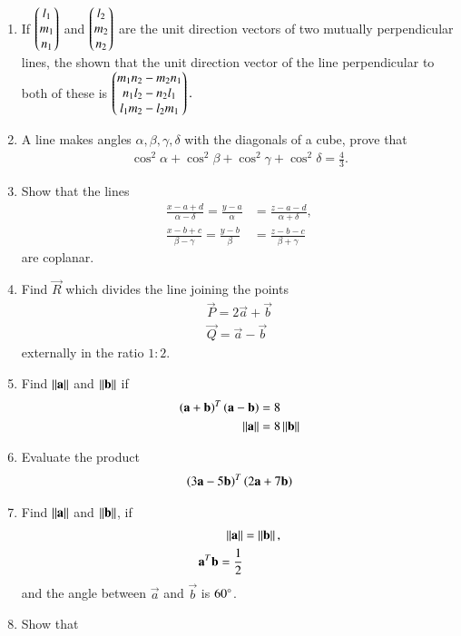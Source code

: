 \begin{enumerate}[label=\arabic*.,ref=\thesubsection.\theenumi]
\item If 
$
\begin{pmatrix}l_1\\m_1\\n_1\end{pmatrix}
$
and
$
\begin{pmatrix}l_2\\m_2\\n_2\end{pmatrix}
$
are the unit direction vectors of two mutually perpendicular lines, the shown that the unit direction vector of the line perpendicular to both of these is
$
\begin{pmatrix}m_1n_2-m_2n_1\\n_1l_2-n_2l_1\\l_1m_2-l_2m_1\end{pmatrix}.
$
\item A line makes angles $\alpha, \beta, \gamma, \delta$ with the diagonals of a cube, prove that \begin{align}
\cos^2\alpha + \cos^2\beta + \cos^2\gamma +\cos^2\delta = \frac{4}{3}.
\end{align}
\item Show that the lines 
\begin{align}
\frac{x-a+d}{\alpha-\delta} = \frac{y-a}{\alpha} &= \frac{z-a-d}{\alpha+\delta}, 
\\
\frac{x-b+c}{\beta-\gamma} = \frac{y-b}{\beta} &= \frac{z-b-c}{\beta+\gamma} 
\end{align}
%
are coplanar.
\item Find $\vec{R}$ which divides the line joining the points 
\begin{align}
\vec{P} = 2\vec{a}+\vec{b}
\\
\vec{Q} = \vec{a}-\vec{b}
\end{align}
externally in the ratio $1:2$.
\item Find $\left\lVert\mathbf{a}\right\rVert$ and $\left\lVert\mathbf{b}\right\rVert$ if 
\begin{align}
\left(\mathbf{a}+\mathbf{b}\right)^T\left(\mathbf{a}-\mathbf{b}\right) &= 8
\\
\left\lVert\mathbf{a}\right\rVert&=8\left\lVert\mathbf{b}\right\rVert
\end{align}
\item Evaluate the product 
\begin{align}
\left(3\mathbf{a}-5\mathbf{b}\right)^T\left(2\mathbf{a}+7\mathbf{b}\right) 
\end{align}
\item Find $\left\lVert\mathbf{a}\right\rVert$ and $\left\lVert\mathbf{b}\right\rVert$, if
\begin{align}
\left\lVert\mathbf{a}\right\rVert &= \left\lVert\mathbf{b}\right\rVert,
\\
\mathbf{a}^T\mathbf{b} = \frac{1}{2} 
\end{align}
and the angle between $\vec{a}$ and $\vec{b}$ is $60\degree$.
\item Show that 
\begin{align}

\end{align}
\end{enumerate}
